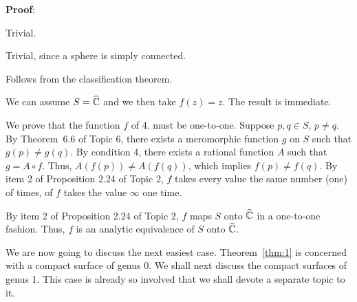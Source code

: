 \documentclass[a4paper,11pt]{article}
\newcounter{topic}
\begin{document}
\begin{mdframed}[skipbelow=1ex]
  \textbf{Proof}:
  \begin{description}
  \parskip=0pt
  \itemsep=0pt
  \item[1 $\Rightarrow$ 2:] Trivial.
  \item[2 $\Rightarrow$ 3:] Trivial, since a sphere is simply
    connected.
  \item[3 $\Rightarrow$ 1:] Follows from the classification theorem.
  \item[1 $\Rightarrow$ 4:] We can assume $S = \widehat{{\mathbb C}}$ and we
    then take $f(z) = z$.  The result is immediate.
  \item[4 $\Rightarrow$ 5:] We prove that the function $f$ of 4. must
    be one-to-one.  Suppose $p, q \in S$, $p \ne q$.  By Theorem~6.6
    of Topic 6, there exists a meromorphic function $g$ on $S$
    such that $g(p) \ne g(q)$.  By condition 4, there exists a
    rational function $A$ such that $g = A \circ f$.  Thus, $A(f(p))
    \ne A(f(q))$, which implies $f(p) \ne f(q)$.  By item 2 of
    Proposition 2.24 of Topic 2, $f$ takes every value the same number
    (one) of times, of $f$ takes the value $\infty$ one time.
  \item[5 $\Rightarrow$ 1:] By item 2 of Proposition 2.24 of Topic 2,
    $f$ maps $S$ onto $\widehat{{\mathbb C}}$ in a one-to-one fashion.  Thus,
    $f$ is an analytic equivalence of $S$ onto $\widehat{{\mathbb C}}$.
  \end{description}
\end{mdframed}

We are now going to discuss the next easiest case.
Theorem~\ref{thm:1} is concerned with a compact surface of genus 0.
We shall next discuss the compact surfaces of genus 1.  This case is
already so involved that we shall devote a separate topic to it.
\end{document}
